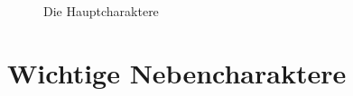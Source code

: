 \begin{figure}[hb!]
	\caption{Die Hauptcharaktere} 
\end{figure}


\clearpage
\section{Wichtige Nebencharaktere}

\begin{figure}[hb!]

\end{figure}
